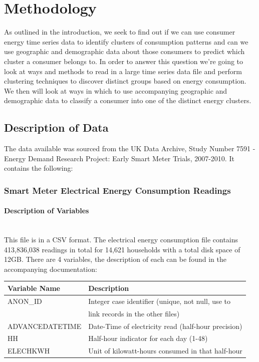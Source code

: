 \chapter{Methodology}
As outlined in the introduction, we seek to find out if we can use consumer energy time series data to identify clusters of consumption patterns and can we use geographic and demographic data about those consumers to predict which cluster a consumer belongs to. In order to answer this question we're going to look at ways and methods to read in a large time series data file and perform clustering techniques to discover distinct groups based on energy consumption. We then will look at ways in which to use accompanying geographic and demographic data to classify a consumer into one of the distinct energy clusters.

\section{Description of Data}
    The data available was sourced from the UK Data Archive, Study Number 7591 - Energy Demand Research Project: Early Smart Meter Trials, 2007-2010. It contains the following:
    \subsection{Smart Meter Electrical Energy Consumption Readings}
        \subsubsection{Description of Variables}
    
            \\
            This file is in a CSV format. The electrical energy consumption file contains 413,836,038 readings in total for 14,621 households with a total disk space of 12GB. There are 4 variables, the description of each can be found in the accompanying documentation: 
        \begin{center}
            \begin{tabular}{|l | l|}
            \hline
             \textbf{Variable Name} & \textbf{Description} \\
             \hline\hline
             ANON\_ID & Integer case identifier (unique, not null, use to \\&  link records in the other files) \\ 
             \hline
             ADVANCEDATETIME & Date-Time of electricity read (half-hour precision) \\
             \hline
             HH & Half-hour indicator for each day (1-48) \\
             \hline
             ELECHKWH & Unit of kilowatt-hours consumed in that half-hour \\
             \hline
            \end{tabular}
        \end{center}
        
